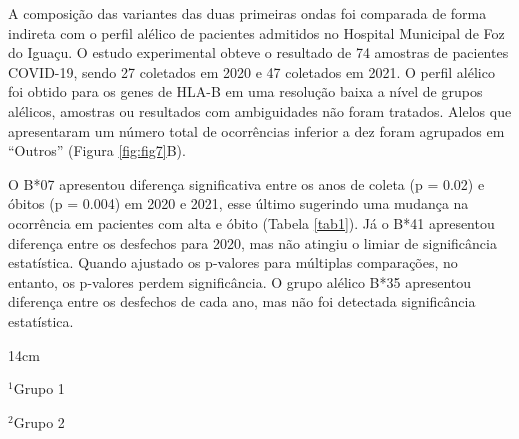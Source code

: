 \begin{justifying}
A composição das variantes das duas primeiras ondas foi comparada de forma indireta com o perfil alélico de pacientes admitidos no Hospital Municipal de Foz do Iguaçu. O estudo experimental obteve o resultado de 74 amostras de pacientes COVID-19, sendo 27 coletados em 2020 e 47 coletados em 2021. O perfil alélico foi obtido para os genes de HLA-B em uma resolução baixa a nível de grupos alélicos, amostras ou resultados com ambiguidades não foram tratados. Alelos que apresentaram um número total de ocorrências inferior a dez foram agrupados em ``Outros'' (Figura \ref{fig:fig7}B).

O B*07 apresentou diferença significativa entre os anos de coleta (p = 0.02) e óbitos (p = 0.004) em 2020 e 2021, esse último sugerindo uma mudança na ocorrência em pacientes com alta e óbito (Tabela \ref{tab1}). Já o B*41 apresentou diferença entre os desfechos para 2020, mas não atingiu o limiar de significância estatística. Quando ajustado os p-valores para múltiplas comparações, no entanto, os p-valores perdem significância. O grupo alélico B*35 apresentou diferença entre os desfechos de cada ano, mas não foi detectada significância estatística. 

\begin{table}[!h]{14cm}
\caption{Comparações entre as Frequências dos Grupos Alélicos.}\label{tab1}
        \begin{tablenotes}\footnotesize
         \raggedright
            \item \scriptsize\textit{$^1$}Grupo 1 
            \item \scriptsize\textit{$^2$}Grupo 2
            \par
        \end{tablenotes}
\end{table}


\end{justifying}
